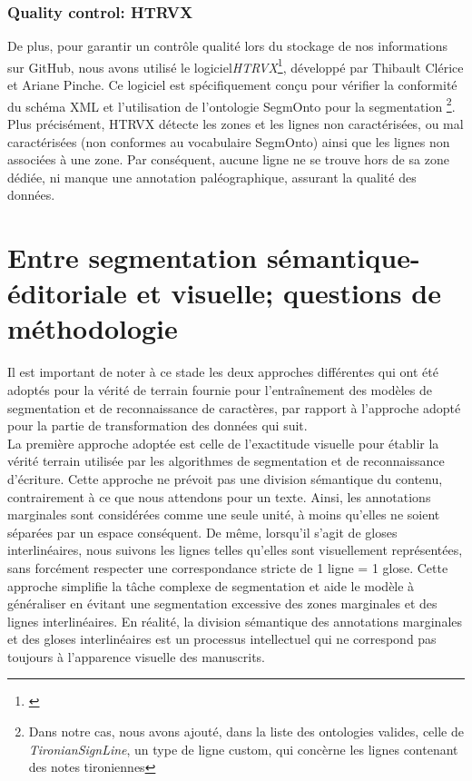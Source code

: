 \documentclass[a4paper, twoside, 12pt]{book}
\begin{document}
\subsubsection{Quality control: HTRVX}
De plus, pour garantir un contrôle qualité lors du stockage de nos informations sur GitHub, nous avons utilisé le logiciel\textit{HTRVX}\footnote{\cite{Clerice_HTRVX_HTR_Validation_2021}}, développé par Thibault Clérice et Ariane Pinche. Ce logiciel est spécifiquement conçu pour vérifier la conformité du schéma XML et l'utilisation de l'ontologie SegmOnto pour la segmentation \footnote{Dans notre cas, nous avons ajouté, dans la liste des ontologies valides, celle de \textit{TironianSignLine}, un type de ligne custom, qui concèrne les lignes contenant des notes tironiennes}. Plus précisément, HTRVX détecte les zones et les lignes non caractérisées, ou mal caractérisées (non conformes au vocabulaire SegmOnto) ainsi que les lignes non associées à une zone. Par conséquent, aucune ligne ne se trouve hors de sa zone dédiée, ni manque une annotation paléographique, assurant la qualité des données. 



\section{Entre segmentation sémantique-éditoriale et visuelle; questions de méthodologie}

Il est important de noter à ce stade les deux approches différentes qui ont été adoptés pour la vérité de terrain fournie pour l'entraînement des modèles de segmentation et de reconnaissance de caractères, par rapport à l'approche adopté pour la partie de transformation des données qui suit. \\


La première approche adoptée est celle de l'exactitude visuelle pour établir la vérité terrain utilisée par les algorithmes de segmentation et de reconnaissance d'écriture. Cette approche ne prévoit pas une division sémantique du contenu, contrairement à ce que nous attendons pour un texte. Ainsi, les annotations marginales sont considérées comme une seule unité, à moins qu'elles ne soient séparées par un espace conséquent. De même, lorsqu'il s'agit de gloses interlinéaires, nous suivons les lignes telles qu'elles sont visuellement représentées, sans forcément respecter une correspondance stricte de 1 ligne = 1 glose. Cette approche simplifie la tâche complexe de segmentation et aide le modèle à généraliser en évitant une segmentation excessive des zones marginales et des lignes interlinéaires. En réalité, la division sémantique des annotations marginales et des gloses interlinéaires est un processus intellectuel qui ne correspond pas toujours à l'apparence visuelle des manuscrits. \\
\end{document}
